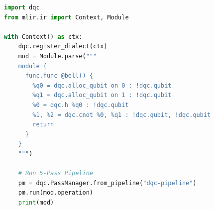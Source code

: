 \begin{lstlisting}[language=Python, caption={Python SDK Script Executing DQC Passes (example.py)}]
import dqc
from mlir.ir import Context, Module

with Context() as ctx:
    dqc.register_dialect(ctx)
    mod = Module.parse("""
    module {
      func.func @bell() {
        %q0 = dqc.alloc_qubit on 0 : !dqc.qubit
        %q1 = dqc.alloc_qubit on 1 : !dqc.qubit
        %0 = dqc.h %q0 : !dqc.qubit
        %1, %2 = dqc.cnot %0, %q1 : !dqc.qubit, !dqc.qubit
        return
      }
    }
    """)
    
    # Run 5-Pass Pipeline
    pm = dqc.PassManager.from_pipeline("dqc-pipeline")
    pm.run(mod.operation)
    print(mod)
\end{lstlisting}
